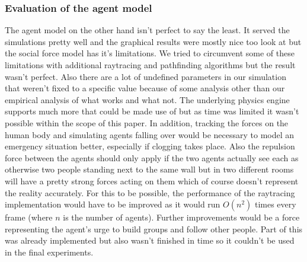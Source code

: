 \documentclass[11pt]{article}
\begin{document}
\subsubsection{Evaluation of the agent model}
The agent model on the other hand isn't perfect to say the least. It served the simulations pretty well and the graphical results were mostly nice too look at but the social force model has it's limitations. We tried to circumvent some of these limitations with additional raytracing and pathfinding algorithms but the result wasn't perfect. Also there are a lot of undefined parameters in our simulation that weren't fixed to a specific value because of some analysis other than our empirical analysis of what works and what not. The underlying physics engine supports much more that could be made use of but as time was limited it wasn't possible within the scope of this paper. In addition, tracking the forces on the human body and simulating agents falling over would be necessary to model an emergency situation better, especially if clogging takes place. Also the repulsion force between the agents should only apply if the two agents actually see each as otherwise two people standing next to the same wall but in two different rooms will have a pretty strong forces acting on them which of course doesn't represent the reality accurately. For this to be possible, the performance of the raytracing implementation would have to be improved as it would run $O(n^2)$ times every frame (where $n$ is the number of agents). Further improvements would be a force representing the agent's urge to build groups and follow other people. Part of this was already implemented but also wasn't finished in time so it couldn't be used in the final experiments.

\end{document}
